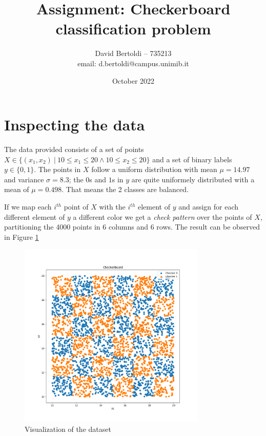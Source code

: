 \documentclass[compsoc]{IEEEtran}
\title{Assignment: Checkerboard classification problem}
\author{David Bertoldi -- 735213 \\ email: d.bertoldi@campus.unimib.it}
\affil{Department of Informatics, Systems and Communication}
\affil{University of Milano-Bicocca}
\date{October 2022}
\begin{document}
\maketitle 



\section{Inspecting the data}
The data provided consists of a set of points $X \in \{(x_1, x_2) \ | \ 10 \leq x_1 \leq 20 \wedge 10 \leq x_2 \leq 20 \}$ and a set of binary labels $y \in \{0, 1\}$.
The points in $X$ follow a uniform distribution with mean $\mu = 14.97$ and variance $\sigma = 8.3$; the $0$s and $1$s in $y$ are quite uniformely distributed with 
a mean of $\mu = 0.498$. That means the 2 classes are balanced. \par
If we map each $i^{th}$ point of $X$ with the $i^{th}$ element of $y$ and assign for each different element of $y$ a different color we get a \emph{check pattern} over the points of $X$, partitioning the 4000 points in 6 columns and 6 rows.
The result can be observed in Figure \ref{fig:checkerboard}

\begin{figure}[ht!]
\centering                                                                        
\includegraphics[width=3.5in]{../images/checkerboard.png}
\captionsetup{justification=centering}                                                                                                                                   
\caption{Visualization of the dataset}
\label{fig:checkerboard}                                                                                                                                                           
\end{figure}
\end{document}
